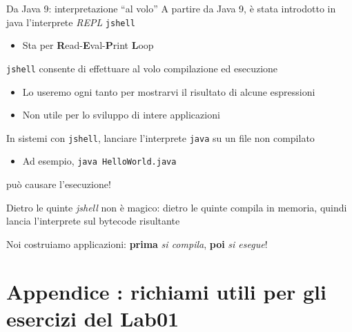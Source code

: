 \documentclass[xcolor=dvipsnames,presentation]{beamer}
\begin{document}
\begin{frame}{Da Java 9: interpretazione ``al volo''}
    A partire da Java 9, è stata introdotto in java l'interprete \textit{REPL} \texttt{jshell}
    \begin{itemize}
        \item Sta per \textbf{R}ead-\textbf{E}val-\textbf{P}rint \textbf{L}oop
    \end{itemize}
    \texttt{jshell} consente di effettuare al volo compilazione ed esecuzione
    \begin{itemize}
        \item Lo useremo ogni tanto per mostrarvi il risultato di alcune espressioni
        \item Non utile per lo sviluppo di intere applicazioni
    \end{itemize}
    In sistemi con \texttt{jshell}, lanciare l'interprete \texttt{java} su un file non compilato
    \begin{itemize}
        \item Ad esempio, \texttt{java HelloWorld.java}
    \end{itemize}
    può causare l'esecuzione!
    \begin{block}{Dietro le quinte}
        \textit{jshell} non è magico: dietro le quinte compila in memoria, quindi lancia l'interprete sul bytecode risultante
    \end{block}
    Noi costruiamo applicazioni: \textbf{prima} \textit{si compila}, \textbf{poi} \textit{si esegue}!
\end{frame}

\section{Appendice : richiami utili per gli esercizi del Lab01}

\end{document}
